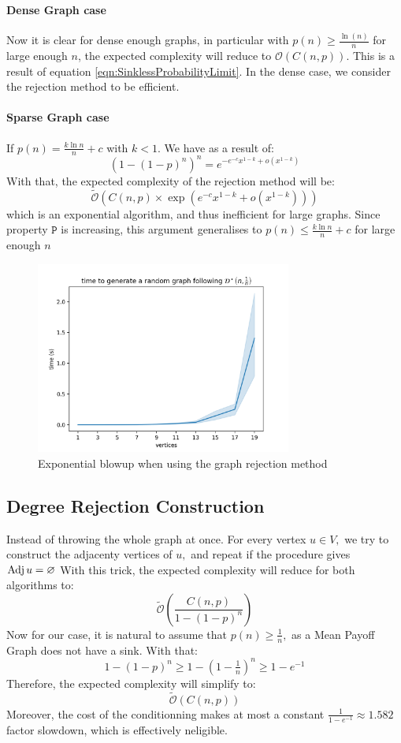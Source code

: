\paragraph{Dense Graph case}
Now it is clear for dense enough graphs, in particular with $p(n) \ge \frac{\ln (n)}{n}$ for large enough $n$, the expected complexity will reduce to $\mathcal{O}(C(n,p))$. This is a result of equation \eqref{eqn:SinklessProbabilityLimit}.
\newline In the dense case, we consider the rejection method to be efficient.
\paragraph{Sparse Graph case}
If $p(n)=\frac{k\ln n}{n}+c$ with $k<1.$ We have as a result of:
$$
(1-(1-p)^n)^n=e^{-e^{-c}x^{1-k}+o(x^{1-k})}
$$
With that, the expected complexity of the rejection method will be:
$$
\tilde{\mathcal{O}}\left(C(n,p)\times \exp\left(e^{-c}x^{1-k}+o(x^{1-k})\right)\right)
$$
which is an exponential algorithm, and thus inefficient for large graphs.
Since property $\mathtt{P}$ is increasing, this argument generalises to $p(n) \le \frac{k\ln n}{n}+c$ for large enough $n$
\begin{figure}[H]
	\centering
	\includegraphics[width=0.75\textwidth]{Figures/BadSparseGraphGen.png}
	\caption{Exponential blowup when using the graph rejection method}
\end{figure}
\FloatBarrier
\subsection{Degree Rejection Construction}
Instead of throwing the whole graph at once. For every vertex $u\in V,$ we try to construct the adjacenty vertices of $u,$ and repeat if the procedure gives $\operatorname{Adj} u =\varnothing$
\newline With this trick, the expected complexity will reduce for both algorithms to:
$$
\tilde{\mathcal{O}}\left(\frac{C(n,p)}{1-(1-p)^n}\right)
$$
Now for our case, it is natural to assume that $p(n) \ge \frac{1}{n},$ as a Mean Payoff Graph does not have a sink. With that: 
$$
1-(1-p)^n \ge 1-(1-\tfrac{1}{n})^n \ge 1-e^{-1}
$$
Therefore, the expected complexity will simplify to:
$$
\tilde{\mathcal{O}}\left(C(n,p)\right)
$$
Moreover, the cost of the conditionning makes at most a constant $\frac{1}{1-e^{-1}}\approx 1.582$ factor slowdown, which is effectively neligible.

